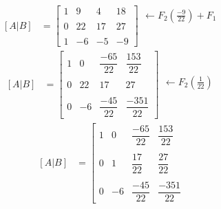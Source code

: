 \documentclass[10pt, a4paper]{article}
\begin{document}
\begin{multicols*}{2}
\begin{align*}
\begin{array}{r}
      \\
    \end{array}
  \end{align*}
  \begin{align*}
    \left[A|B\right]&=\left[
      \begin{array}{ccc|c}
        1 & 9 & 4 & 18 \\\\
        0 & 22 & 17 & 27 \\\\
        1 & -6 & -5 & -9
      \end{array}
    \right]
    \begin{array}{r}
      \leftarrow F_2\left(\frac{-9}{22}\right)+F_1 \\\\
      \\
      \\
      \\
    \end{array}
  \end{align*}
  \begin{align*}
    \left[A|B\right]&=\left[
      \begin{array}{ccc|c}
        1 & 0 & \dfrac{-65}{22} & \dfrac{153}{22} \\\\
        0 & 22 & 17 & 27 \\\\
        0 & -6 & \dfrac{-45}{22} & \dfrac{-351}{22}
      \end{array}
    \right]
    \begin{array}{r}
       \\\\\\
      \leftarrow F_2\left(\frac{1}{22}\right) \\\\
      \\
      \\
    \end{array}
  \end{align*}
  \begin{align*}
    \left[A|B\right]&=\left[
      \begin{array}{ccc|c}
        1 & 0 & \dfrac{-65}{22} & \dfrac{153}{22} \\\\
        0 & 1 & \dfrac{17}{22} & \dfrac{27}{22} \\\\
        0 & -6 & \dfrac{-45}{22} & \dfrac{-351}{22}

\end{array}
\end{align*}
\end{multicols*}
\end{document}
